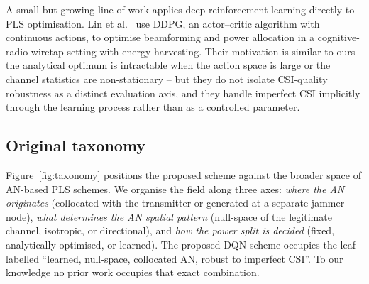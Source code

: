 \documentclass[conference]{IEEEtran}
\begin{document}
A small but growing line of work applies deep reinforcement learning
directly to PLS optimisation. Lin et al.\ \cite{lin2023drlpls} use
DDPG, an actor--critic algorithm with continuous actions, to optimise
beamforming and power allocation in a cognitive-radio wiretap setting
with energy harvesting. Their motivation is similar to ours -- the
analytical optimum is intractable when the action space is large or
the channel statistics are non-stationary -- but they do not isolate
CSI-quality robustness as a distinct evaluation axis, and they handle
imperfect CSI implicitly through the learning process rather than as a
controlled parameter.

\subsection{Original taxonomy}

Figure~\ref{fig:taxonomy} positions the proposed scheme against the
broader space of AN-based PLS schemes. We organise the field along
three axes: \emph{where the AN originates} (collocated with the
transmitter or generated at a separate jammer node), \emph{what
determines the AN spatial pattern} (null-space of the legitimate
channel, isotropic, or directional), and \emph{how the power split is
decided} (fixed, analytically optimised, or learned). The proposed
DQN scheme occupies the leaf labelled ``learned, null-space,
collocated AN, robust to imperfect CSI''. To our knowledge no prior
work occupies that exact combination.
\end{document}
